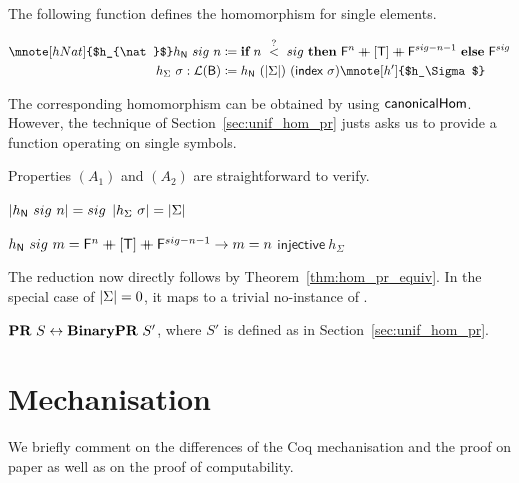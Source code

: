 The following function defines the homomorphism for single elements. 
\begin{definition}\label{def:hnat_hsig}
  \begin{align*}
    \mnote[hNat]{$h_{\nat}$}
    h_{\nat}~sig~n&\defeq \ITE{n~\overset{?}{<}~sig}{\bfalse^n \concat [\btrue] \concat \bfalse^{sig -n -1}}{\bfalse^{sig}} \\
    h_{\Sigma}~\sigma : \listsof{\bool} &\defeq h_{\nat}~(\length{\Sigma})~(\textsf{index}~\sigma)\mnote[h']{$h_\Sigma$}
  \end{align*}
\end{definition}
The corresponding homomorphism can be obtained by using $\textsf{canonicalHom}$. However, the technique of Section~\ref{sec:unif_hom_pr} justs asks us to provide a function operating on single symbols.

Properties $(A_1)$ and $(A_2)$ are straightforward to verify.

\begin{fact}[Uniformity]\leavevmode
  \begin{enumerate}
     $|h_{\mathsf{N}}~sig~n| = sig$
    \coqitem[hP_length] $|h_{\Sigma}~\sigma| = |\Sigma|$
  \end{enumerate}
\end{fact}

\begin{fact}[Injectivity]\leavevmode
  \begin{enumerate}
    \coqitem[hP_inv1] $h_{\mathsf{N}}~sig~m = \mathsf{F}^n \mathbin{+\mkern-10mu+} [\mathsf{T}] \mathbin{+\mkern-10mu+} \mathsf{F}^{sig - n - 1} \rightarrow m = n$
    \coqitem[hP_injective] $\textsf{injective}~h_{\Sigma}$
  \end{enumerate}
\end{fact}

The reduction now directly follows by Theorem~\ref{thm:hom_pr_equiv}.
In the special case of $|\Sigma| = 0$, it maps to a trivial no-instance of \BPR{}. 

\begin{lemma}
  $\textbf{PR}{}~S \leftrightarrow \textbf{BinaryPR}{}~S'$,
  where $S'$ is defined as in Section~\ref{sec:unif_hom_pr}.
\end{lemma}

\section{Mechanisation}
We briefly comment on the differences of the Coq mechanisation and the proof on paper as well as on the proof of computability. 

